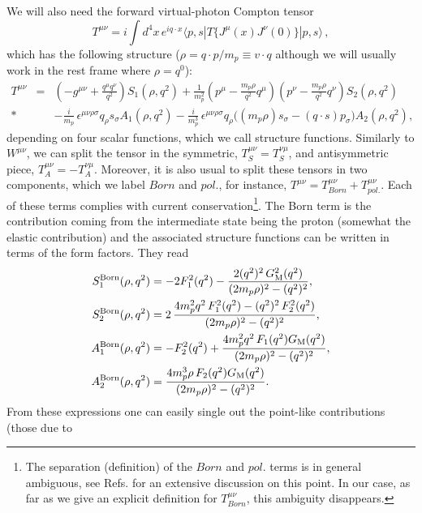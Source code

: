 \documentclass[a4paper,12pt]{article}
\newcommand{\bea}{\begin{eqnarray}}
\newcommand{\eea}{\end{eqnarray}}
\newcommand{\nn}{\nonumber}
\begin{document}
We will also need the forward virtual-photon Compton tensor
\begin{equation} 
 T^{\mu\nu} = i\!\int\! d^4x\, e^{iq\cdot x}
  \langle {p,s}| T \{J^\mu(x)J^\nu(0)\} |{p,s}\rangle
\,,
\end{equation}
which has the following structure ($\rho=q\cdot p/m_p\equiv v \cdot q$ although we will usually work in the 
rest frame where $\rho=q^0$):
\bea \label{inv-dec}
 T^{\mu\nu} &=
  &\left( -g^{\mu\nu} + \frac{q^\mu q^\nu}{q^2}\right) S_1(\rho,q^2) 
  + \frac1{m_p^2} \left( p^\mu - \frac{m_p\rho}{q^2} q^\mu \right)
    \left( p^\nu - \frac{m_p\rho}{q^2} q^\nu \right) S_2(\rho,q^2) \nn 
	\\*
  && - \frac i{m_p}\, \epsilon^{\mu\nu\rho\sigma} q_\rho s_\sigma A_1(\rho,q^2)
	- \frac i{m_p^3}\, \epsilon^{\mu\nu\rho\sigma} q_\rho
   \bigl( (m_p\rho) s_\sigma - (q\cdot s) p_\sigma \bigr) A_2(\rho,q^2),
\eea
depending on four scalar functions, which we call structure functions. 
Similarly to $W^{\mu\nu}$, we can split the tensor in the symmetric,
$T_S^{\mu\nu}=T_S^{\nu\mu}$, and antisymmetric piece, $T_A^{\mu\nu}=-T_A^{\nu\mu}$. 
Moreover, it is also usual to split these 
tensors in two components, which we label $Born$ and $pol.$, for instance,
$T^{\mu\nu}=T^{\mu\nu}_{Born}+T^{\mu\nu}_{pol.}$. 
Each of these terms complies with current conservation\footnote{The separation 
(definition) of the $Born$ and $pol.$ terms is in general ambiguous, see Refs. 
\cite{Scherer:1996ux,Fearing:1996gs} for an extensive discussion on this point. 
In our case, as far as we give an explicit definition 
for $T^{\mu\nu}_{Born}$, this ambiguity disappears.}. 
The Born term is the contribution coming from the intermediate state being the proton (somewhat the 
elastic contribution) and the associated structure functions can be written in terms of the form factors. 
They read
\bea
 S_1^{\rm Born}(\rho,q^2) & =
  -2F_1^2(q^2) - \frac {2(q^2)^2\,G_{\rm M}^2(q^2)}{(2m_p\rho)^2-(q^2)^2}, \\
 S_2^{\rm Born}(\rho,q^2) & =
  2\, \frac {4m_p^2q^2\,F_1^2(q^2)-(q^2)^2\,F_2^2(q^2)}{(2m_p\rho)^2-(q^2)^2}, \\
 A_1^{\rm Born}(\rho,q^2) & =  \label{Born.A1}
  -F_2^2(q^2) + \frac {4m_p^2q^2\,F_1(q^2)G_{\rm M}(q^2)}{(2m_p\rho)^2-(q^2)^2}, \\
 A_2^{\rm Born}(\rho,q^2) & =
  \frac {4m_p^3\rho\,F_2(q^2)G_{\rm M}(q^2)}{(2m_p\rho)^2-(q^2)^2}.
\eea
From these expressions one can easily single out the point-like contributions (those due to 
\end{document}
